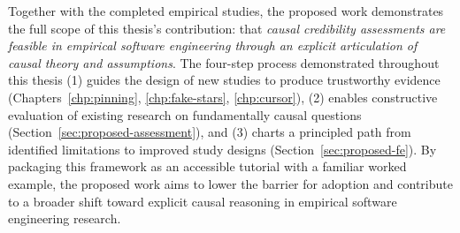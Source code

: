 Together with the completed empirical studies, the proposed work demonstrates the full scope of this thesis's contribution: that \emph{causal credibility assessments are feasible in empirical software engineering through an explicit articulation of causal theory and assumptions}.
The four-step process demonstrated throughout this thesis (1) guides the design of new studies to produce trustworthy evidence (Chapters~\ref{chp:pinning}, \ref{chp:fake-stars}, \ref{chp:cursor}), (2) enables constructive evaluation of existing research on fundamentally causal questions (Section~\ref{sec:proposed-assessment}), and (3) charts a principled path from identified limitations to improved study designs (Section~\ref{sec:proposed-fe}).
By packaging this framework as an accessible tutorial with a familiar worked example, the proposed work aims to lower the barrier for adoption and contribute to a broader shift toward explicit causal reasoning in empirical software engineering research.
